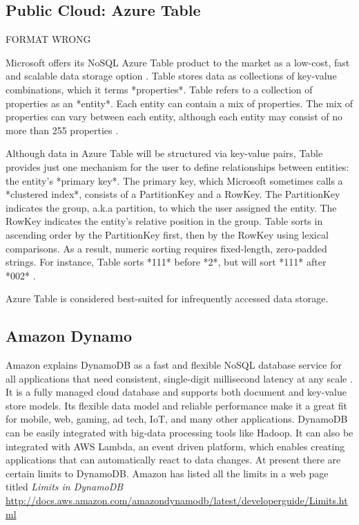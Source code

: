 {     \pv
     
\subsection{Public Cloud: Azure Table}

     FORMAT WRONG

     Microsoft offers its NoSQL Azure Table product to the market as a
     low-cost, fast and scalable data storage
     option \cite{www-what-to-use}. Table stores data as collections
     of key-value combinations, which it terms *properties*.  Table
     refers to a collection of properties as an *entity*.  Each entity
     can contain a mix of properties.  The mix of properties can vary
     between each entity, although each entity may consist of no more
     than 255 properties \cite{www-blobqueuetable}.

     Although data in Azure Table will be structured via key-value
     pairs, Table provides just one mechanism for the user to define
     relationships between entities: the entity's *primary key*.  The
     primary key, which Microsoft sometimes calls a *clustered index*,
     consists of a PartitionKey and a RowKey.  The PartitionKey
     indicates the group, a.k.a partition, to which the user assigned
     the entity.  The RowKey indicates the entity's relative position
     in the group.  Table sorts in ascending order by the PartitionKey
     first, then by the RowKey using lexical comparisons.  As a
     result, numeric sorting requires fixed-length, zero-padded
     strings.  For instance, Table sorts *111* before *2*, but will
     sort *111* after *002* \cite{www-scalable-partitioning}.

     Azure Table is considered best-suited for infrequently accessed
     data storage.

     \pv

\subsection{Amazon Dynamo}

     Amazon explains DynamoDB as a fast and flexible
     NoSQL database service for all applications that need consistent, 
     single-digit millisecond latency at any scale \cite{www.dyndb}.
     It is a fully managed
     cloud database and supports both document and key-value store models. 
     Its flexible data model and reliable performance make it a great fit 
     for mobile, web, gaming, ad tech, IoT, and many other applications. 
     DynamoDB can be easily integrated with big-data processing tools like 
     Hadoop. It can also be integrated with AWS Lambda, an event driven platform, 
     which enables creating applications that can automatically react to data 
     changes. At present there are certain limits to DynamoDB. Amazon has listed 
     all the limits in a web page titled \textit{Limits in DynamoDB }
     \url{http://docs.aws.amazon.com/amazondynamodb/latest/developerguide/Limits.html}

}
